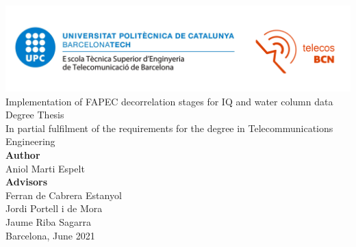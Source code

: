\thispagestyle{empty}

\begin{center}
	\includegraphics[width=\textwidth]{images/logo.png}\\
	
	\vspace*{2.5cm}
	\Huge
	Implementation of FAPEC decorrelation stages for IQ and water column data\\
	
	\vspace*{2.6cm}
	\large
	Degree Thesis\\
	In partial fulfilment of the requirements for the degree in Telecommunications Engineering\\
	
	\vspace*{2cm}
	\textbf{Author}\\
	Aniol Marti Espelt\\
	\vspace*{1.5em}
	\textbf{Advisors}\\
	Ferran de Cabrera Estanyol\\
	Jordi Portell i de Mora\\
	Jaume Riba Sagarra\\
	
	\vspace*{2.5cm}
	Barcelona, June 2021
	
\end{center}
